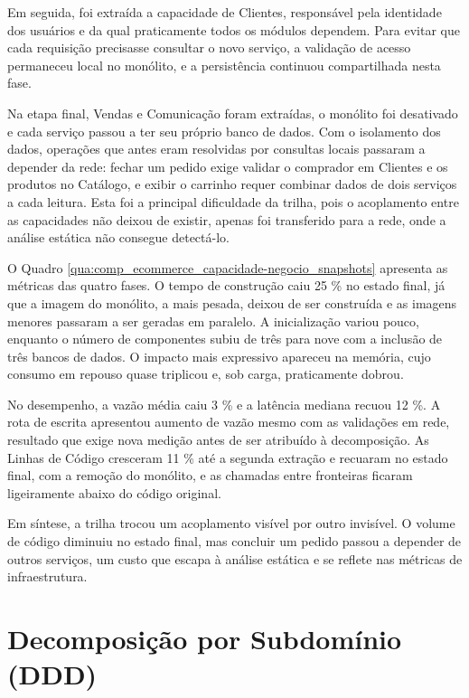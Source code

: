 Em seguida, foi extraída a capacidade de Clientes, responsável pela identidade dos usuários e da qual praticamente todos os módulos dependem. Para evitar que cada requisição precisasse consultar o novo serviço, a validação de acesso permaneceu local no monólito, e a persistência continuou compartilhada nesta fase.

Na etapa final, Vendas e Comunicação foram extraídas, o monólito foi desativado e cada serviço passou a ter seu próprio banco de dados. Com o isolamento dos dados, operações que antes eram resolvidas por consultas locais passaram a depender da rede: fechar um pedido exige validar o comprador em Clientes e os produtos no Catálogo, e exibir o carrinho requer combinar dados de dois serviços a cada leitura. Esta foi a principal dificuldade da trilha, pois o acoplamento entre as capacidades não deixou de existir, apenas foi transferido para a rede, onde a análise estática não consegue detectá-lo.

O Quadro \ref{qua:comp_ecommerce_capacidade-negocio_snapshots} apresenta as métricas das quatro fases. O tempo de construção caiu 25 \% no estado final, já que a imagem do monólito, a mais pesada, deixou de ser construída e as imagens menores passaram a ser geradas em paralelo. A inicialização variou pouco, enquanto o número de componentes subiu de três para nove com a inclusão de três bancos de dados. O impacto mais expressivo apareceu na memória, cujo consumo em repouso quase triplicou e, sob carga, praticamente dobrou.

No desempenho, a vazão média caiu 3 \% e a latência mediana recuou 12 \%. A rota de escrita apresentou aumento de vazão mesmo com as validações em rede, resultado que exige nova medição antes de ser atribuído à decomposição. As Linhas de Código cresceram 11 \% até a segunda extração e recuaram no estado final, com a remoção do monólito, e as chamadas entre fronteiras ficaram ligeiramente abaixo do código original.

Em síntese, a trilha trocou um acoplamento visível por outro invisível. O volume de código diminuiu no estado final, mas concluir um pedido passou a depender de outros serviços, um custo que escapa à análise estática e se reflete nas métricas de infraestrutura.




\section{Decomposição por Subdomínio (DDD)}
\label{sec:metodologia_subdominio}

